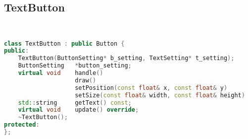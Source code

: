 \subsection{TextButton}
\begin{lstlisting}[language=C++]


class TextButton : public Button {
public:
    TextButton(ButtonSetting* b_setting, TextSetting* t_setting);
    ButtonSetting   *button_setting;
    virtual void    handle()                                            override,
                    draw()                                              override,
                    setPosition(const float& x, const float& y)         override,
                    setSize(const float& width, const float& height)    override,
    std::string     getText() const;
    virtual void    update() override;
    ~TextButton();
protected:
};





\end{lstlisting}
